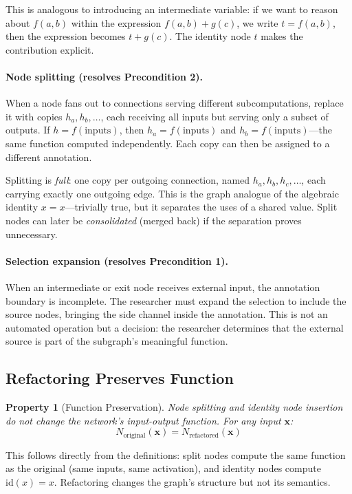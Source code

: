 \documentclass[11pt]{article}
\newtheorem{property}{Property}
\begin{document}
This is analogous to introducing an intermediate variable: if we want to reason about $f(a, b)$ within the expression $f(a,b) + g(c)$, we write $t = f(a, b)$, then the expression becomes $t + g(c)$. The identity node $t$ makes the contribution explicit.

\paragraph{Node splitting (resolves Precondition 2).} When a node fans out to connections serving different subcomputations, replace it with copies $h_a, h_b, \ldots$, each receiving all inputs but serving only a subset of outputs. If $h = f(\text{inputs})$, then $h_a = f(\text{inputs})$ and $h_b = f(\text{inputs})$---the same function computed independently. Each copy can then be assigned to a different annotation.

Splitting is \emph{full}: one copy per outgoing connection, named $h_a, h_b, h_c, \ldots$, each carrying exactly one outgoing edge. This is the graph analogue of the algebraic identity $x = x$---trivially true, but it separates the uses of a shared value. Split nodes can later be \emph{consolidated} (merged back) if the separation proves unnecessary.

\paragraph{Selection expansion (resolves Precondition 1).} When an intermediate or exit node receives external input, the annotation boundary is incomplete. The researcher must expand the selection to include the source nodes, bringing the side channel inside the annotation. This is not an automated operation but a decision: the researcher determines that the external source is part of the subgraph's meaningful function.

\subsection{Refactoring Preserves Function}

\begin{property}[Function Preservation]
Node splitting and identity node insertion do not change the network's input-output function. For any input $\mathbf{x}$:
\[
N_{\text{original}}(\mathbf{x}) = N_{\text{refactored}}(\mathbf{x})
\]
\end{property}

This follows directly from the definitions: split nodes compute the same function as the original (same inputs, same activation), and identity nodes compute $\text{id}(x) = x$. Refactoring changes the graph's structure but not its semantics.
\end{document}
